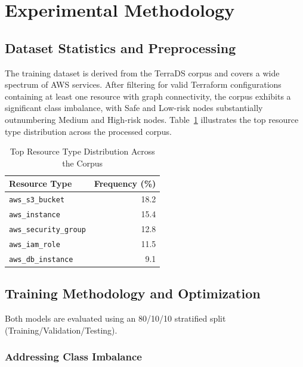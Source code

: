 \documentclass[conference]{IEEEtran}
\begin{document}
\section{Experimental Methodology}

\subsection{Dataset Statistics and Preprocessing}

The training dataset is derived from the TerraDS corpus and covers a wide spectrum of AWS services. After filtering for valid Terraform configurations containing at least one resource with graph connectivity, the corpus exhibits a significant class imbalance, with Safe and Low-risk nodes substantially outnumbering Medium and High-risk nodes. Table~\ref{tab:resources} illustrates the top resource type distribution across the processed corpus.

\begin{table}[htbp]
\caption{Top Resource Type Distribution Across the Corpus}
\label{tab:resources}
\centering
\begin{tabular}{lr}
\toprule
\textbf{Resource Type} & \textbf{Frequency (\%)} \\
\midrule
\texttt{aws\_s3\_bucket} & 18.2 \\
\texttt{aws\_instance} & 15.4 \\
\texttt{aws\_security\_group} & 12.8 \\
\texttt{aws\_iam\_role} & 11.5 \\
\texttt{aws\_db\_instance} & 9.1 \\
\bottomrule
\end{tabular}
\end{table}

\subsection{Training Methodology and Optimization}

Both models are evaluated using an 80/10/10 stratified split (Training/Validation/Testing).

\subsubsection{Addressing Class Imbalance}
\end{document}

